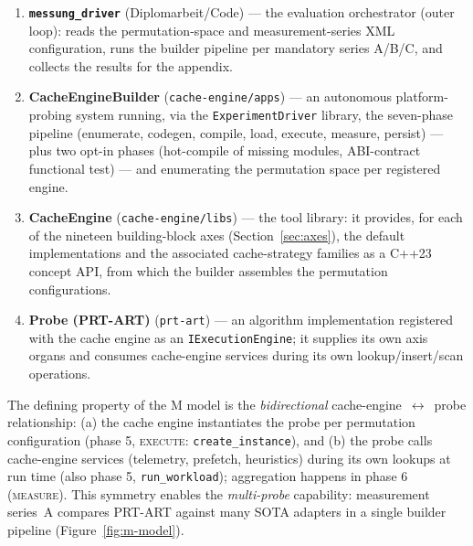 \begin{enumerate}
  \item \textbf{\texttt{messung\_driver}} (Diplomarbeit/Code) --- the evaluation orchestrator (outer
  loop): reads the permutation-space and measurement-series XML configuration, runs the builder
  pipeline per mandatory series A/B/C, and collects the results for the appendix.
  \item \textbf{CacheEngineBuilder} (\texttt{cache-engine/apps}) --- an autonomous platform-probing
  system running, via the \texttt{ExperimentDriver} library, the seven-phase pipeline (enumerate,
  codegen, compile, load, execute, measure, persist) --- plus two opt-in phases (hot-compile of
  missing modules, ABI-contract functional test) --- and enumerating the permutation space per
  registered engine.
  \item \textbf{CacheEngine} (\texttt{cache-engine/libs}) --- the tool library: it provides, for
  each of the nineteen building-block axes (Section~\ref{sec:axes}), the default implementations and
  the associated cache-strategy families as a C++23 concept API, from which the builder assembles
  the permutation configurations.
  \item \textbf{Probe (PRT-ART)} (\texttt{prt-art}) --- an algorithm implementation registered with
  the cache engine as an \texttt{IExecutionEngine}; it supplies its own axis organs and consumes
  cache-engine services during its own lookup/insert/scan operations.
\end{enumerate}

The defining property of the M model is the \emph{bidirectional}
cache-engine~$\leftrightarrow$~probe relationship: (a) the cache engine instantiates the probe per
permutation configuration (phase 5, \textsc{execute}: \texttt{create\_instance}), and (b) the probe
calls cache-engine services (telemetry, prefetch, heuristics) during its own lookups at run time
(also phase 5, \texttt{run\_workload}); aggregation happens in phase 6 (\textsc{measure}). This
symmetry enables the \emph{multi-probe} capability: measurement series~A compares PRT-ART against
many SOTA adapters in a single builder pipeline (Figure~\ref{fig:m-model}).

